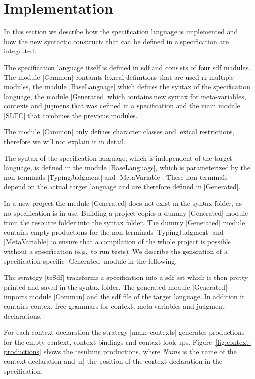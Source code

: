 \section{Implementation}
\label{sec:generate-sdf}
In this section we describe how the specification language is
implemented and how the new syntactic constructs that can be defined
in a specification are integrated.

The specification language itself is defined in \gls{sdf} and consists
of four \gls{sdf} modules. The module \code|Common| containts lexical
definitions that are used in multiple modules, the module
\code|BaseLanguage| which defines the syntax of the specification
language, the module \code|Generated| which contains new syntax for
meta-variables, contexts and jugmens that was defined in a
specification and the main module \code|SLTC| that combines the
previous modules.

The module \code|Common| only defines character classes and lexical
restrictions, therefore we will not explain it in detail.

The syntax of the specification language, which is independent of the
target language, is defined in the module \code|BaseLanguage|, which
is parameterized by the non-terminals \code|TypingJudgment| and
\code|MetaVariable|. These non-terminals depend on the actual target
language and are therefore defined in \code|Generated|.

In a new project the module \code|Generated| does not exist in the
syntax folder, as no specification is in use. Building a project
copies a dummy \code|Generated| module from the resource folder into
the syntax folder. The dummy \code|Generated| module contains empty
productions for the non-terminals \code|TypingJudgment| and
\code|MetaVariable| to ensure that a compilation of the whole project
is possible without a specification (e.g.\ to run tests). We describe
the generation of a specification specific \code|Generated| module in
the following.

The strategy \code|toSdf| transforms a specification into a \gls{sdf}
\gls{ast} which is then pretty printed and saved in the syntax
folder. The generated module \code|Generated| imports module
\code|Common| and the \gls{sdf} file of the target language. In
addition it contains context-free grammars for context, meta-variables
and judgment declarations.

For each context declaration the strategy \code|make-contexts|
generates productions for the empty context, context bindings and
context look ups. Figure~\ref{fig:context-productions} shows the
resulting productions, where \textit{Name} is the name of the context
declaration and \code|n| the position of the context declaration in
the specification.

